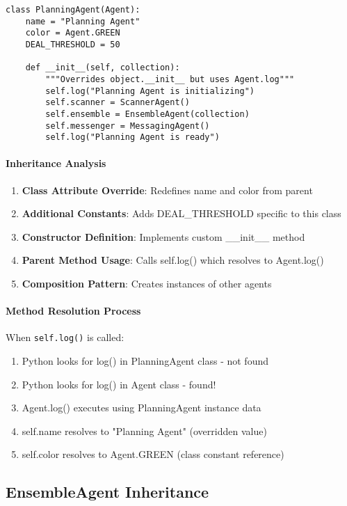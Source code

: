 \begin{lstlisting}[caption=PlanningAgent Class Definition]
class PlanningAgent(Agent):
    name = "Planning Agent"
    color = Agent.GREEN
    DEAL_THRESHOLD = 50

    def __init__(self, collection):
        """Overrides object.__init__ but uses Agent.log"""
        self.log("Planning Agent is initializing")
        self.scanner = ScannerAgent()
        self.ensemble = EnsembleAgent(collection)
        self.messenger = MessagingAgent()
        self.log("Planning Agent is ready")
\end{lstlisting}

\paragraph{Inheritance Analysis}
\begin{enumerate}
\item \textbf{Class Attribute Override}: Redefines name and color from parent
\item \textbf{Additional Constants}: Adds DEAL\_THRESHOLD specific to this class
\item \textbf{Constructor Definition}: Implements custom \_\_init\_\_ method
\item \textbf{Parent Method Usage}: Calls self.log() which resolves to Agent.log()
\item \textbf{Composition Pattern}: Creates instances of other agents
\end{enumerate}

\paragraph{Method Resolution Process}
When \texttt{self.log()} is called:
\begin{enumerate}
\item Python looks for log() in PlanningAgent class - not found
\item Python looks for log() in Agent class - found!
\item Agent.log() executes using PlanningAgent instance data
\item self.name resolves to "Planning Agent" (overridden value)
\item self.color resolves to Agent.GREEN (class constant reference)
\end{enumerate}

\subsection{EnsembleAgent Inheritance}

